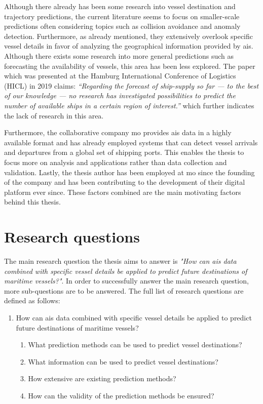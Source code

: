 Although there already has been some research into vessel destination and trajectory predictions, the current literature seems to focus on smaller-scale predictions often considering topics such as collision avoidance and anomaly detection. Furthermore, as already mentioned, they extensively overlook specific vessel details in favor of analyzing the geographical information provided by \acrshort{ais}. Although there exists some research into more general predictions such as forecasting the availability of vessels, this area has been less explored. The paper~\cite{lechtenberg2019} which was presented at the Hamburg International Conference of Logistics (HICL) in 2019 claims: \textit{“Regarding the forecast of ship-supply so far --- to the best of our knowledge --- no research has investigated possibilities to predict the number of available ships in a certain region of interest.”} which further indicates the lack of research in this area.

Furthermore, the collaborative company \acrfull{mo} provides \acrshort{ais} data in a highly available format and has already employed systems that can detect vessel arrivals and departures from a global set of shipping ports. This enables the thesis to focus more on analysis and applications rather than data collection and validation. Lastly, the thesis author has been employed at \acrshort{mo} since the founding of the company and has been contributing to the development of their digital platform ever since. These factors combined are the main motivating factors behind this thesis.

\section{Research questions}
\label{sec:research_questions}

The main research question the thesis aims to answer is \textit{"How can \acrshort{ais} data combined with specific vessel details be applied to predict future destinations of maritime vessels?"}. In order to successfully answer the main research question, more sub-questions are to be answered. The full list of research questions are defined as follows:

\begin{enumerate}
    \item How can \acrshort{ais} data combined with specific vessel details be applied to predict future destinations of maritime vessels?
    \begin{enumerate}
    \item What prediction methods can be used to predict vessel destinations?
    \item What information can be used to predict vessel destinations?
    \item How extensive are existing prediction methods?
    \item How can the validity of the prediction methods be ensured?
    \end{enumerate}
\end{enumerate}

